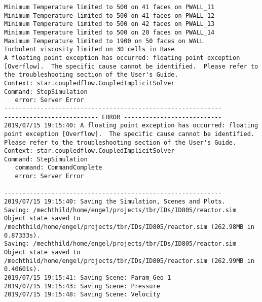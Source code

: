 \documentclass{article}
\begin{document}
{\begin{verbatim}
Minimum Temperature limited to 500 on 41 faces on PWALL_11
Minimum Temperature limited to 500 on 41 faces on PWALL_12
Minimum Temperature limited to 500 on 42 faces on PWALL_13
Minimum Temperature limited to 500 on 20 faces on PWALL_14
Maximum Temperature limited to 1900 on 50 faces on WALL
Turbulent viscosity limited on 30 cells in Base
A floating point exception has occurred: floating point exception [Overflow].  The specific cause cannot be identified.  Please refer to the troubleshooting section of the User's Guide.
Context: star.coupledflow.CoupledImplicitSolver
Command: StepSimulation
   error: Server Error
------------------------------------------------------------
-------------------------- ERROR ---------------------------
2019/07/15 19:15:40: A floating point exception has occurred: floating point exception [Overflow].  The specific cause cannot be identified.  Please refer to the troubleshooting section of the User's Guide.
Context: star.coupledflow.CoupledImplicitSolver
Command: StepSimulation
   command: CommandComplete
   error: Server Error

------------------------------------------------------------
2019/07/15 19:15:40: Saving the Simulation, Scenes and Plots.
Saving: /mechthild/home/engel/projects/tbr/IDs/ID805/reactor.sim
Object state saved to /mechthild/home/engel/projects/tbr/IDs/ID805/reactor.sim (262.98MB in 0.87333s).
Saving: /mechthild/home/engel/projects/tbr/IDs/ID805/reactor.sim
Object state saved to /mechthild/home/engel/projects/tbr/IDs/ID805/reactor.sim (262.99MB in 0.40601s).
2019/07/15 19:15:41: Saving Scene: Param_Geo 1
2019/07/15 19:15:43: Saving Scene: Pressure
2019/07/15 19:15:48: Saving Scene: Velocity
\end{verbatim}
}
\clearpage
\end{document}

